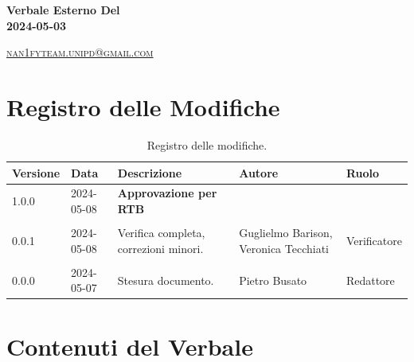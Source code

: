 \documentclass[8pt]{article}
\begin{document}
\begin{titlepage}
\begin{minipage}[t]{0.47\textwidth}
{		}
		\vspace{4mm}\vspace{4mm}
	\end{minipage}
	\vspace{4cm}
	\begin{center}
		\begin{flushright}
			{\fontsize{30pt}{52pt}\selectfont \textbf{Verbale Esterno Del\\2024-05-03\\}} %
		\end{flushright}
		\vspace{3cm}
	\end{center}
	\vspace{8.5 cm}
	{\small \textsc{\href{mailto: nan1fyteam.unipd@gmail.com}{nan1fyteam.unipd@gmail.com}}}
\end{titlepage}

\pagestyle{mystyle}
\section*{Registro delle Modifiche}
\begin{table}[ht!]	
	\centering
	\begin{tabular}{p{1.2cm} p{2cm} p{6cm} p{3cm} p{2cm}}
		\toprule
		\textbf{Versione}& \textbf{Data} & \textbf{Descrizione} & \textbf{Autore} & \textbf{Ruolo} \\
		\midrule	 
    1.0.0 & 2024-05-08 & \textbf{Approvazione per RTB}  &  & \\\\
    0.0.1 & 2024-05-08 & Verifica completa, correzioni minori.  & Guglielmo Barison, Veronica Tecchiati & Verificatore \\\\
    0.0.0 & 2024-05-07 & Stesura documento.  & Pietro Busato & Redattore \\
		\bottomrule
	\end{tabular}
	\caption{Registro delle modifiche.}
	\label{table:Registro delle modifiche}
\end{table}
\newpage
\tableofcontents
\clearpage
\newpage
\justifying
\section{Contenuti del Verbale}
\end{document}

